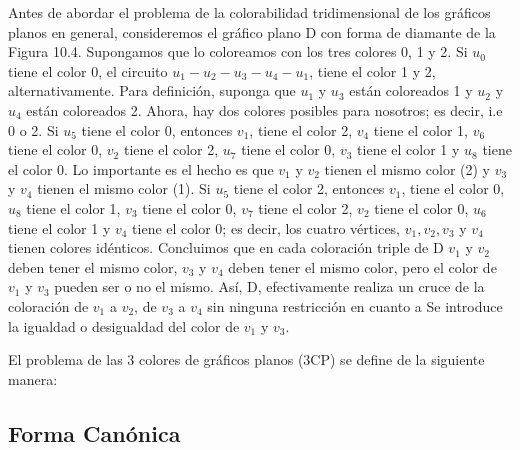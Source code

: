 Antes de abordar el problema de la colorabilidad tridimensional de los gráficos planos en general, consideremos el 
gráfico plano D con forma de diamante de la Figura 10.4. Supongamos que lo coloreamos con los tres colores 0, 1 y 2. 
Si $u_{0}$ tiene el color 0, el circuito $u_{1} - u_{2} - u_{3} - u_{4} - u_ {1}$, tiene el color 1 y 2, 
alternativamente. Para definición, suponga que $ u_ {1} $ y $ u_ {3} $ están coloreados 1 y $u_ {2}$ y $ u_ {4}$ 
están coloreados 2. Ahora, hay dos colores posibles para nosotros; es decir, i.e 0 o 2. Si $u_ {5}$ tiene el color 0,
entonces $v_{1}$, tiene el color 2, $v_{4}$ tiene el color 1, $v_{6}$ tiene el color 0, $v_{2}$ tiene el color 2,
$u_{7}$ tiene el color 0, $v_{3}$ tiene el color 1 y $u_{8}$ tiene el color 0. Lo importante es el hecho es que 
$v_{1}$ y $v_{2}$ tienen el mismo color (2) y $v_{3}$ y $v_{4}$ tienen el mismo color (1). Si $u_{5}$ tiene el color 2, 
entonces $v_{1}$, tiene el color 0, $u_{8}$ tiene el color 1, $v_{3}$ tiene el color 0, $v_{7}$ tiene el color 2, 
$v_{2}$ tiene el color 0, $u_{6}$ tiene el color 1 y $v_{4}$ tiene el color 0; es decir, los cuatro vértices, 
$v_{1}, v_{2}, v_{3}$ y $v_{4}$ tienen colores idénticos. Concluimos que en cada coloración triple de D $v_{1}$ y $v_{2}$
deben tener el mismo color, $v_{3}$ y $v_{4}$ deben tener el mismo color, pero el color de $v_{1}$ y $v_{3}$ pueden ser 
o no el mismo. Así, D, efectivamente realiza un cruce de la coloración de $v_{1}$ a $v_{2}$, de $v_{3}$ a $v_{4}$ sin ninguna restricción en cuanto a
Se introduce la igualdad o desigualdad del color de $v_{1}$ y $v_{3}$.

El problema de las 3 colores de gráficos planos (3CP) se define de la siguiente manera:






















\subsection{Forma Canónica}


